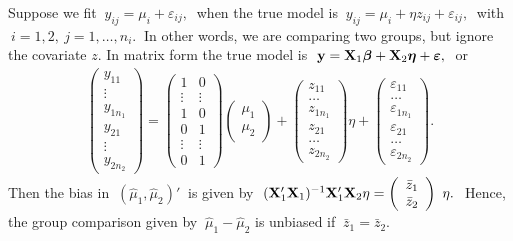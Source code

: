 \bsexa
\label{exa.dep1}
 Suppose we fit 
$\ y_{ij}=\mu_i+\varepsilon_{ij},\ $ 
when the true model is 
$\ y_{ij}=\mu_i+\eta z_{ij}+\varepsilon_{ij},\ $ 
with $\ i=1,2,\ j=1,\ldots,n_i.\ $  In other words, we are comparing two groups, but ignore the covariate
$z$. In matrix form the true model is $\
\mathbf{y}=\mathbf{X}_1\mbox{\boldmath $\beta$}+\mathbf{X}_2\mbox{\boldmath $\eta$}+\mbox{\boldmath $\varepsilon$},\ $ or \\
\begin{eqnarray*}
\left(\begin{array}{c}
	y_{11}\\\vdots\\ y_{1n_1}\\y_{21}\\\vdots\\y_{2n_2}
	\end{array}\right)
=\left(\begin{array}{cc}
	1&0\\\vdots&\vdots\\1&0\\
	0&1\\\vdots&\vdots\\0&1
	\end{array}\right)
\left(\begin{array}{c}\mu_1\\\mu_2\end{array}\right)
+\left(\begin{array}{c}
	z_{11}\\\ldots\\z_{1n_1}\\z_{21}\\\ldots\\z_{2n_2}
	\end{array}\right)\eta
+\left(\begin{array}{c}
	\varepsilon_{11}\\\ldots\\\varepsilon_{1n_1}\\
	\varepsilon_{21}\\\ldots\\\varepsilon_{2n_2}
	\end{array}\right).
\end{eqnarray*}
Then the bias in $\ (\hat{\mu}_1,\hat{\mu}_2)'\ $ is given by 
$\ (\bfX_1'\bfX_1)^{-1}\bfX_1'\bfX_2 \eta =  \left(\begin{array}{c}\bar{z}_1\\\bar{z}_2\end{array}\right)\ \eta.\ $
Hence, the group comparison given by $\ \hat{\mu}_1-\hat{\mu}_2 $ is unbiased if
$\ \bar{z}_1=\bar{z}_2.$
\eexa


